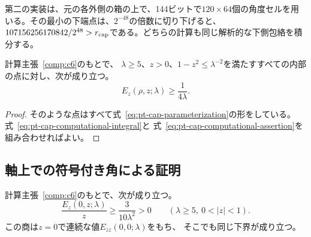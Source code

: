 第二の実装は、元の各外側の箱の上で、144ビットで$120\times64$個の角度セルを用いる。その最小の下端点は、$2^{-48}$の倍数に切り下げると、$107156256170842/2^{48}>r_{\rm cap}$である。どちらの計算も同じ解析的な下側包絡を積分する。

\begin{lemma}[北側の冠での評価]
\label{lem:pt-north-cap}
計算主張~\ref{comp:c6}のもとで、
$\lambda\geq5$、$z>0$、$1-z^2\leq\lambda^{-2}$を満たすすべての内部の点に対し、次が成り立つ。
\begin{equation}
 E_z(\rho,z;\lambda)\geq\frac{1}{4\lambda}.
\label{eq:pt-north-cap}
\end{equation}
\end{lemma}

\begin{proof}
そのような点はすべて式~\eqref{eq:pt-cap-parameterization}の形をしている。
式~\eqref{eq:pt-cap-computational-integral}と
式~\eqref{eq:pt-cap-computational-assertion}を組み合わせればよい。
\end{proof}

\subsection{軸上での符号付き角による証明}
\label{subsec:pt-axis}

\begin{lemma}[軸上での一様な正値性]
\label{lem:pt-axis-positive}
計算主張~\ref{comp:c6}のもとで、次が成り立つ。
\begin{equation}
 \frac{E_z(0,z;\lambda)}{z}
 \geq\frac{3}{10\lambda^2}>0
 \qquad(\lambda\geq5,\ 0<|z|<1).
\label{eq:pt-axis-positive}
\end{equation}
この商は$z=0$で連続な値$E_{zz}(0,0;\lambda)$をもち、
そこでも同じ下界が成り立つ。
\end{lemma}

